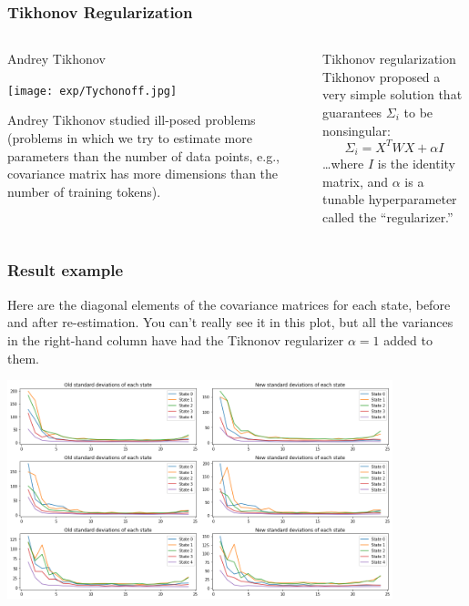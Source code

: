 \documentclass{beamer}
\begin{document}
\begin{frame}
  \frametitle{Tikhonov Regularization}
  \begin{columns}
    \begin{column}{0.5\textwidth}
    \begin{block}{Andrey Tikhonov}
      \centerline{\texttt{[image: exp/Tychonoff.jpg]}}
      
      Andrey Tikhonov studied ill-posed problems (problems in which we try to
      estimate more parameters than the number of data points, e.g.,
      covariance matrix has more dimensions than the number of training
      tokens).
    \end{block}
    \end{column}
    \begin{column}{0.5\textwidth}
    \begin{block}{Tikhonov regularization}
      Tikhonov proposed a very simple solution that guarantees
      $\Sigma_i$ to be nonsingular:
      \begin{displaymath}
        \Sigma_i = X^T W X + \alpha I
      \end{displaymath}
      \ldots where $I$ is the identity matrix, and $\alpha$ is a tunable
      hyperparameter called the ``regularizer.''
    \end{block}
    \end{column}
  \end{columns}
\end{frame}

\begin{frame}
  \frametitle{Result example}

  Here are the diagonal elements of the covariance matrices for each
  state, before and after re-estimation.  You can't really see it in
  this plot, but all the variances in the right-hand column have had
  the Tiknonov regularizer $\alpha=1$ added to them.
  \centerline{\includegraphics[height=2.5in]{sigmadiag.png}}
\end{frame}
\end{document}
